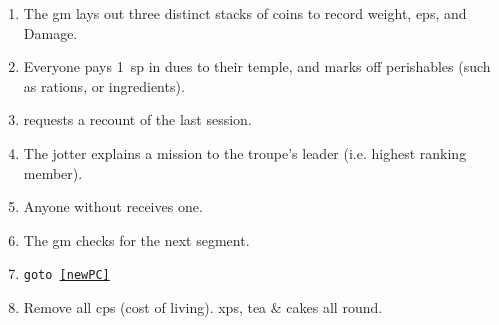 
\begin{enumerate}
  \item
  The \gls{gm} lays out three distinct stacks of coins to record \gls{weight}, \glspl{ep}, and Damage.
  \item
  Everyone pays 1~\gls{sp} in dues to their \gls{temple}, and marks off perishables (such as \glspl{ration}, or \glspl{ingredient}).
  \item
   requests a recount of the last session.
  \item
  The \gls{jotter} explains a mission to the troupe's leader (i.e. highest ranking member).
  \item
  Anyone without  receives one.
  \label{newPC}
  \item
  The \gls{gm} checks for the next \gls{segment}.
  \item
  {\tt goto \ref{newPC}}
  \item
  Remove all \glspl{cp} (cost of living).
  \Glspl{xp}, tea \& cakes all round.
\end{enumerate}

